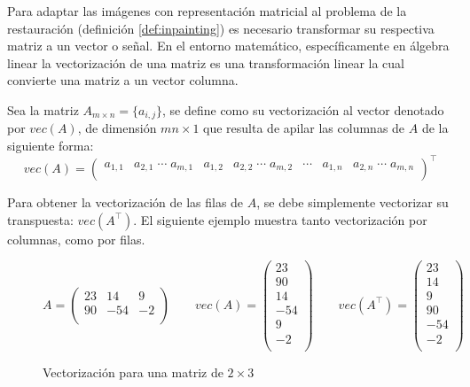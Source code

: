 Para adaptar las im\'agenes con representaci\'on matricial al problema de la restauraci\'on (definición \ref{def:inpainting}) es necesario transformar su respectiva matriz a un vector o señal. En el entorno matem\'atico, específicamente en \'algebra linear \cite{enwiki:la} la vectorizaci\'on de una matriz es una transformaci\'on linear la cual convierte una matriz a un vector columna.
\begin{definition}
	Sea la matriz $A_{m \times n} = \{a_{i,j}\}$, se define como su vectorizaci\'on al vector denotado por $vec(A)$, de dimensi\'on $mn \times 1$ que resulta de apilar las columnas de $A$ de la siguiente forma:
	\begin{equation*}
		vec(A) = \left(
		\begin{array}{ccccccc}
		a_{1,1}&a_{2,1}\;\cdots\;a_{m,1}&a_{1,2}&a_{2,2}\;\cdots\;a_{m,2}&\cdots&a_{1,n}&a_{2,n}\;\cdots\;a_{m,n}\\
		\end{array} \right)^\intercal
	\end{equation*}
\end{definition}
Para obtener la vectorizaci\'on de las filas de $A$, se debe simplemente vectorizar su transpuesta: $vec(A^\intercal)$. El siguiente ejemplo muestra tanto vectorizaci\'on por columnas, como por filas.
\begin{figure}[h]
	\[
		A = \left(
		\begin{matrix}
			23 & 14 & 9\\
			90 & -54 & -2\\
		\end{matrix}\right)
		\qquad
		vec(A) = \left(
		\begin{matrix}
			23\\
			90\\
			14\\
			-54\\
			9\\
			-2\\
		\end{matrix}\right)
		\qquad
		vec(A^\intercal) = \left(
		\begin{matrix}
			23\\
			14\\
			9\\
			90\\
			-54\\
			-2\\
		\end{matrix}\right)
	\]
	\label{ex:vectorization}
	\caption{Vectorizaci\'on para una matriz de $2 \times 3$}
\end{figure}

